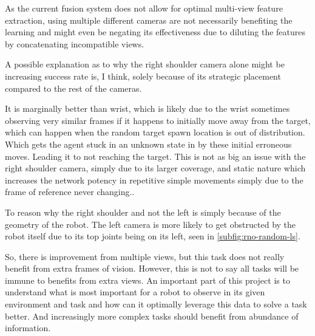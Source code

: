 As the current fusion system does not allow for optimal multi-view feature extraction, using multiple different cameras are not necessarily benefiting the learning and might even be negating its effectiveness due to diluting the features by concatenating incompatible views.  

A possible explanation as to why the right shoulder camera alone might be increasing success rate is, I think, solely because of its strategic placement compared to the rest of the cameras. 

It is marginally better than wrist, which is likely due to the wrist sometimes observing very similar frames if it happens to initially move away from the target, which can happen when the random target spawn location is out of distribution. Which gets the agent stuck in an unknown state in by these initial erroneous moves. Leading it to not reaching the target. This is not as big an issue with the right shoulder camera, simply due to its larger coverage, and static nature which increases the network potency in repetitive simple movements simply due to the frame of reference never changing.\todo[color=purple]{}. 

To reason why the right shoulder and not the left is simply because of the geometry of the robot. The left camera is more likely to get obstructed by the robot itself due to its top joints being on its left, seen in \ref{subfig:rno-random-ls}. 

So, there is improvement from multiple views, but this task does not really benefit from extra frames of vision. However, this is not to say all tasks will be immune to benefits from extra views. An important part of this project is to understand what is most important for a robot to observe in its given environment and task and how can it optimally leverage this data to solve a task better. And increasingly more complex tasks should benefit from abundance of information.

